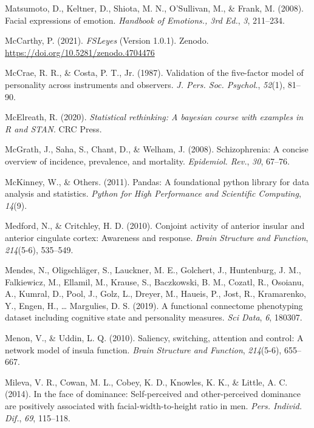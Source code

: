 \documentclass[12pt,american,a4paper,oneside,]{memoir} %
\begin{document}
\leavevmode\hypertarget{ref-Matsumoto2008-qk}{}%
Matsumoto, D., Keltner, D., Shiota, M. N., O'Sullivan, M., \& Frank, M. (2008). Facial expressions of emotion. \emph{Handbook of Emotions., 3rd Ed.}, \emph{3}, 211--234.

\leavevmode\hypertarget{ref-McCarthy2019-yt}{}%
McCarthy, P. (2021). \emph{FSLeyes} (Version 1.0.1). Zenodo. \url{https://doi.org/10.5281/zenodo.4704476}

\leavevmode\hypertarget{ref-McCrae1987-ww}{}%
McCrae, R. R., \& Costa, P. T., Jr. (1987). Validation of the five-factor model of personality across instruments and observers. \emph{J. Pers. Soc. Psychol.}, \emph{52}(1), 81--90.

\leavevmode\hypertarget{ref-McElreath2020-pz}{}%
McElreath, R. (2020). \emph{Statistical rethinking: A bayesian course with examples in R and STAN}. CRC Press.

\leavevmode\hypertarget{ref-McGrath2008-oj}{}%
McGrath, J., Saha, S., Chant, D., \& Welham, J. (2008). Schizophrenia: A concise overview of incidence, prevalence, and mortality. \emph{Epidemiol. Rev.}, \emph{30}, 67--76.

\leavevmode\hypertarget{ref-McKinney2011-kl}{}%
McKinney, W., \& Others. (2011). Pandas: A foundational python library for data analysis and statistics. \emph{Python for High Performance and Scientific Computing}, \emph{14}(9).

\leavevmode\hypertarget{ref-medford2010conjoint}{}%
Medford, N., \& Critchley, H. D. (2010). Conjoint activity of anterior insular and anterior cingulate cortex: Awareness and response. \emph{Brain Structure and Function}, \emph{214}(5-6), 535--549.

\leavevmode\hypertarget{ref-Mendes2019-yh}{}%
Mendes, N., Oligschläger, S., Lauckner, M. E., Golchert, J., Huntenburg, J. M., Falkiewicz, M., Ellamil, M., Krause, S., Baczkowski, B. M., Cozatl, R., Osoianu, A., Kumral, D., Pool, J., Golz, L., Dreyer, M., Haueis, P., Jost, R., Kramarenko, Y., Engen, H., \ldots{} Margulies, D. S. (2019). A functional connectome phenotyping dataset including cognitive state and personality measures. \emph{Sci Data}, \emph{6}, 180307.

\leavevmode\hypertarget{ref-menon2010saliency}{}%
Menon, V., \& Uddin, L. Q. (2010). Saliency, switching, attention and control: A network model of insula function. \emph{Brain Structure and Function}, \emph{214}(5-6), 655--667.

\leavevmode\hypertarget{ref-Mileva2014-ld}{}%
Mileva, V. R., Cowan, M. L., Cobey, K. D., Knowles, K. K., \& Little, A. C. (2014). In the face of dominance: Self-perceived and other-perceived dominance are positively associated with facial-width-to-height ratio in men. \emph{Pers. Individ. Dif.}, \emph{69}, 115--118.
\end{document}
